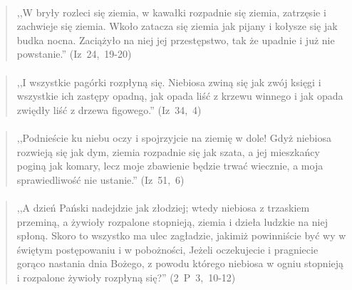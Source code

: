 \documentclass[10pt,a4paper,oneside]{article}
\begin{document}
\paragraph{}
\begin{quote}
,,W bryły rozleci się ziemia, w kawałki rozpadnie się ziemia, zatrzęsie i zachwieje się ziemia. Wkoło zatacza się ziemia jak pijany i kołysze się jak budka nocna. Zaciążyło na niej jej przestępstwo, tak że upadnie i już nie powstanie.'' \mbox{(Iz 24, 19-20)}
\end{quote}
\paragraph{}
\begin{quote}
,,I wszystkie pagórki rozpłyną się. Niebiosa zwiną się jak zwój księgi i wszystkie ich zastępy opadną, jak opada liść z krzewu winnego i jak opada zwiędły liść z drzewa figowego.'' \mbox{(Iz 34, 4)}
\end{quote}
\paragraph{}
\begin{quote}
,,Podnieście ku niebu oczy i spojrzyjcie na ziemię w dole! Gdyż niebiosa rozwieją się jak dym, ziemia rozpadnie się jak szata, a jej mieszkańcy poginą jak komary, lecz moje zbawienie będzie trwać wiecznie, a moja sprawiedliwość nie ustanie.'' \mbox{(Iz 51, 6)}
\end{quote}
\paragraph{}
\begin{quote}
,,A dzień Pański nadejdzie jak złodziej; wtedy niebiosa z trzaskiem przeminą, a żywioły rozpalone stopnieją, ziemia i dzieła ludzkie na niej spłoną. Skoro to wszystko ma ulec zagładzie, jakimiż powinniście być wy w świętym postępowaniu i w pobożności, Jeżeli oczekujecie i pragniecie gorąco nastania dnia Bożego, z powodu którego niebiosa w ogniu stopnieją i rozpalone żywioły rozpłyną się?'' \mbox{(2 P 3, 10-12)}
\end{quote}
\end{document}
